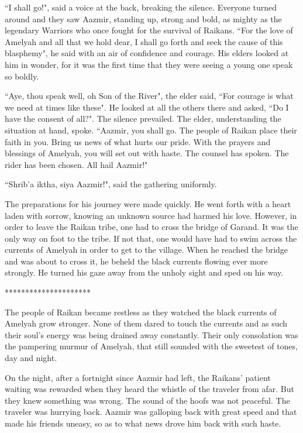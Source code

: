 \documentclass[twoside,11pt,titlepage]{article}
\begin{document}
``I shall go!", said a voice at the back, breaking the silence. Everyone turned around and they saw Aazmir, standing up, strong and bold, as mighty as the legendary Warriors who once fought for the survival of Raikans. ``For the love of Amelyah and all that we hold dear, I shall go forth and seek the cause of this blasphemy", he said with an air of confidence and courage. His elders looked at him in wonder, for it was the first time that they were seeing a young one speak so boldly.

``Aye, thou speak well, oh Son of the River", the elder said, ``For courage is what we need at times like these". He looked at all the others there and asked, ``Do I have the consent of all?". The silence prevailed. The elder, understanding the situation at hand, spoke. ``Aazmir, you shall go. The people of Raikan place their faith in you. Bring us news of what hurts our pride. With the prayers and blessings of Amelyah, you will set out with haste. The counsel has spoken. The rider has been chosen. All hail Aazmir!"

``Shrib'a iktha, siya Aazmir!", said the gathering uniformly.

The preparations for his journey were made quickly. He went forth with a heart laden with sorrow, knowing an unknown source had harmed his love. However, in order to leave the Raikan tribe, one had to cross the bridge of Garand. It was the only way on foot to the tribe. If not that, one would have had to swim across the currents of Amelyah in order to get to the village. When he reached the bridge and was about to cross it, he beheld the black currents flowing ever more strongly. He turned his gaze away from the unholy sight and sped on his way.

\bigskip
\begin{center}
*********************
\end{center}

The people of Raikan became restless as they watched the black currents of Amelyah grow stronger. None of them dared to touch the currents and as such their soul’s energy was being drained away constantly. Their only consolation was the pampering murmur of Amelyah, that still sounded with the sweetest of tones, day and night.

On the night, after a fortnight since Aazmir had left, the Raikans' patient waiting was rewarded when they heard the whistle of the traveler from afar. But they knew something was wrong. The sound of the hoofs was not peaceful. The traveler was hurrying back. Aazmir was galloping back with great speed and that made his friends uneasy, so as to what news drove him back with such haste.
\end{document}
